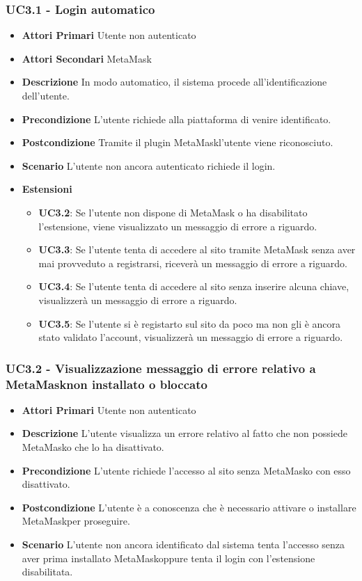 \subsubsection{UC3.1 - Login automatico}
\begin{itemize}
	\item \textbf{Attori Primari}
	Utente non autenticato
	\item \textbf{Attori Secondari}
	MetaMask\glo
	\item \textbf{Descrizione}
	In modo automatico, il sistema procede all'identificazione dell'utente.
	\item \textbf{Precondizione}
	L'utente richiede alla piattaforma di venire identificato.
	\item \textbf{Postcondizione}
	Tramite il plugin MetaMask\glo l'utente viene riconosciuto.
	\item \textbf{Scenario}
	L'utente non ancora autenticato richiede il login.
	\item \textbf{Estensioni}
	\begin{itemize}
		\item \textbf{UC3.2}: Se l'utente non dispone di MetaMask o ha disabilitato l'estensione, viene visualizzato un messaggio di errore a riguardo.
		\item \textbf{UC3.3}: Se l'utente tenta di accedere al sito tramite MetaMask senza aver mai provveduto a registrarsi, riceverà un messaggio di errore a riguardo.
		\item \textbf{UC3.4}: Se l'utente tenta di accedere al sito senza inserire alcuna chiave, visualizzerà un messaggio di errore a riguardo.
		\item \textbf{UC3.5}: Se l'utente si è registarto sul sito da poco ma non gli è ancora stato validato l'account, visualizzerà un messaggio di errore a riguardo.
	\end{itemize}
\end{itemize}
\subsubsection{UC3.2 - Visualizzazione messaggio di errore relativo a MetaMask\glo non installato o bloccato}
\begin{itemize}
	\item \textbf{Attori Primari}
	Utente non autenticato
	\item \textbf{Descrizione}
	L'utente visualizza un errore relativo al fatto che non possiede MetaMask\glo o che lo ha disattivato.
	\item \textbf{Precondizione}
	L'utente richiede l'accesso al sito senza MetaMask\glo o con esso disattivato.
	\item \textbf{Postcondizione}
	L'utente è a conoscenza che è necessario attivare o installare MetaMask\glo per proseguire.
	\item \textbf{Scenario}
	L'utente non ancora identificato dal sistema tenta l'accesso senza aver prima installato MetaMask\glo oppure tenta il login con l'estensione disabilitata.
\end{itemize}
